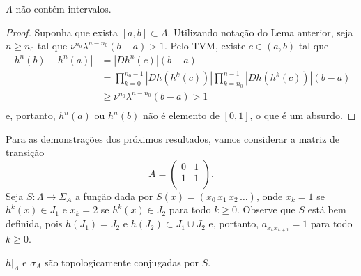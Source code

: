 \begin{lemma}
$\Lambda$ não contém intervalos.
\end{lemma}

\begin{proof}
Suponha que exista $[a, b] \subset \Lambda$. Utilizando notação do Lema anterior, seja $n \geq n_0$ tal que $\nu^{n_0} \lambda^{n - n_0} (b - a) > 1$. Pelo TVM, existe $c \in (a, b)$ tal que
\begin{align*}
|h^n(b) - h^n(a)| & = |D h^n(c)|(b-a) \\
& = \prod_{k=0}^{n_0-1} |D h(h^k(c))| \prod_{k=n_0}^{n-1} |D h(h^k(c))| (b-a) \\
& \geq \nu^{n_0} \lambda^{n-n_0} (b-a) > 1 \\
\end{align*}
e, portanto, $h^n(a)$ ou $h^n(b)$ não é elemento de $[0,1]$, o que é um absurdo.
\end{proof}

Para as demonstrações dos próximos resultados, vamos considerar a matriz de transição
$$A =
\begin{pmatrix}
0 & 1 \\
1 & 1 \\
\end{pmatrix}.$$
Seja $S: \Lambda \to \Sigma_A$ a função dada por $S(x) = (x_0 \, x_1 \, x_2 \, \dots)$, onde $x_k = 1$ se $h^k(x) \in J_1$ e $x_k = 2$ se $h^k(x) \in J_2$ para todo $k \geq 0$. Observe que $S$ está bem definida, pois $h(J_1) = J_2$ e $h(J_2) \subset J_1 \cup J_2$ e, portanto, $a_{x_k x_{k+1}} = 1$ para todo $k \geq 0$. 

\begin{theorem}
$h|_\Lambda$ e $\sigma_A$ são topologicamente conjugadas por $S$.
\end{theorem}

